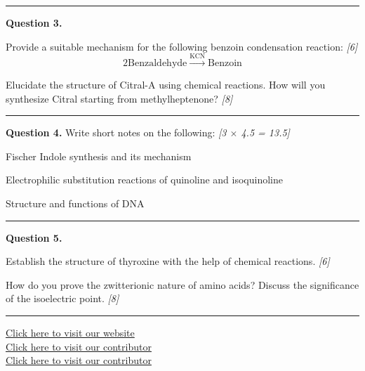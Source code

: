 \documentclass[11pt,a4paper]{article}
\newcommand{\pts}[1]{\hfill   \textit{[#1]}}
\begin{document}
\medskip\rule{\linewidth}{0.2pt}




\noindent   \textbf{Question 3.}

\begin{parts}
  \item Provide a suitable mechanism for the following benzoin condensation reaction: \pts{6}
    \[ 2 \text{Benzaldehyde} \xrightarrow{ \text{KCN}}  \text{Benzoin} \]
  \item Elucidate the structure of Citral-A using chemical reactions. How will you synthesize Citral starting from methylheptenone? \pts{8}
\end{parts}

\medskip\rule{\linewidth}{0.2pt}




\noindent   \textbf{Question 4.} Write short notes on the following: \pts{3 $ \times$ 4.5 = 13.5}

\begin{parts}
  \item Fischer Indole synthesis and its mechanism
  \item Electrophilic substitution reactions of quinoline and isoquinoline
  \item Structure and functions of DNA
\end{parts}

\medskip\rule{\linewidth}{0.2pt}




\noindent   \textbf{Question 5.}

\begin{parts}
  \item Establish the structure of thyroxine with the help of chemical reactions. \pts{6}
  \item How do you prove the zwitterionic nature of amino acids? Discuss the significance of the isoelectric point. \pts{8}
\end{parts}

\vfill
\rule{\linewidth}{0.4pt}

\begin{center}\small
  \href{https://bhu-exam.vercel.app/}{Click here to visit our website}\\[4pt]
  \href{https://me-aryan.vercel.app/}{Click here to visit our contributor}\\[4pt]
  \href{https://quashan-me.vercel.app/}{Click here to visit our contributor}
\end{center}
\end{document}
